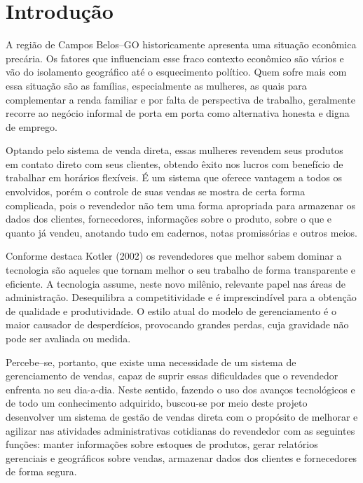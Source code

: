 \documentclass[chapter=TITLE,12pt,oneside,a4paper,english,french,sumario=tradicional,spanish,brazil,]{abntex2}
\begin{document}
\begin{SingleSpace}
\tableofcontents*
\thispagestyle{empty}
\end{SingleSpace}
\textual %

\chapter*{Introdução}%
A região de Campos Belos–GO historicamente apresenta uma situação econômica precária. Os fatores que influenciam esse fraco contexto econômico são vários e vão do isolamento geográfico até o esquecimento político. Quem sofre mais com essa situação são as famílias, especialmente as mulheres, as quais para complementar a renda familiar e por falta de perspectiva de trabalho, geralmente recorre ao negócio informal de porta em porta como alternativa honesta e digna de emprego.

Optando pelo sistema de venda direta, essas mulheres revendem seus produtos em contato direto com seus clientes, obtendo êxito nos lucros com benefício de trabalhar em horários flexíveis. É um sistema que oferece vantagem a todos os envolvidos, porém o controle de suas vendas se mostra de certa forma complicada, pois o revendedor não tem uma forma apropriada para armazenar os dados dos clientes, fornecedores, informações sobre o produto, sobre o que e quanto já vendeu, anotando tudo em cadernos, notas promissórias e outros meios.

Conforme destaca Kotler (2002) os revendedores que melhor sabem dominar a tecnologia são aqueles que tornam melhor o seu trabalho de forma transparente e eficiente. A tecnologia assume, neste novo milênio, relevante papel nas áreas de administração. Desequilibra a competitividade e é imprescindível para a obtenção de qualidade e produtividade. O estilo atual do modelo de gerenciamento é o maior causador de desperdícios, provocando grandes perdas, cuja gravidade não pode ser avaliada ou medida.

Percebe–se, portanto, que existe uma necessidade de um sistema de gerenciamento de vendas, capaz de suprir essas dificuldades que o revendedor enfrenta no seu dia-a-dia. Neste sentido, fazendo o uso dos avanços tecnológicos e de todo um conhecimento adquirido, buscou-se por meio deste projeto desenvolver um sistema de gestão de vendas direta com o propósito de melhorar e agilizar nas atividades administrativas cotidianas do revendedor com as seguintes funções: manter informações sobre estoques de produtos, gerar relatórios gerenciais e geográficos sobre vendas, armazenar dados dos clientes e fornecedores de forma segura.
\end{document}
